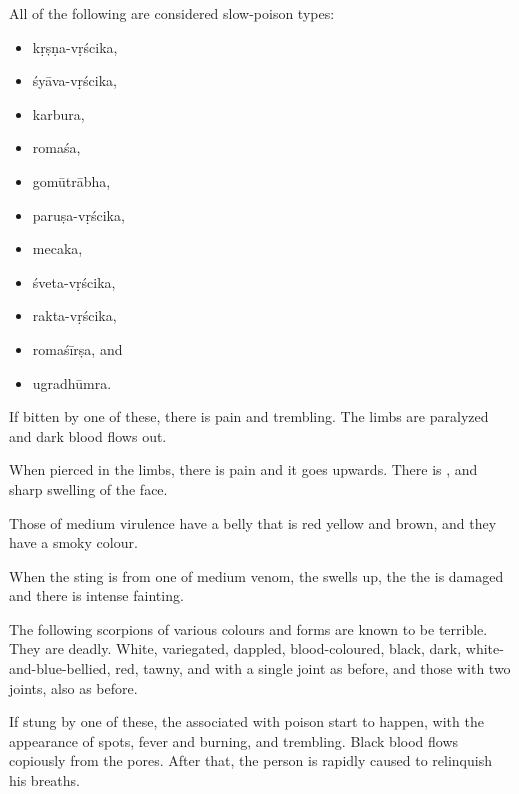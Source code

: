 \begin{translation}
All of the following are considered slow-poison types:
\begin{itemize}
    \item \Gls{kṛṣṇa-vṛścika},
    \item \Gls{śyāva-vṛścika},
    \item \Gls{karbura},
    \item \Gls{romaśa},
    \item \Gls{gomūtrābha},
    \item \Gls{paruṣa-vṛścika},
    \item \Gls{mecaka},
    \item \Gls{śveta-vṛścika},
    \item \Gls{rakta-vṛścika},
    \item \Gls{romaśīrṣa}, and
    \item \Gls{ugradhūmra}.    
\end{itemize}
If bitten by one of these, there is pain and trembling.  The limbs are paralyzed 
and dark blood flows out. 

\item[61ab]

When pierced in the limbs, there is pain and it goes upwards.  There is 
, and sharp swelling of the face.  

\item [61cd]

Those of medium virulence have a belly that is red
yellow and brown, and they have a smoky colour. 

\item[63ab]

When the sting is from one of medium venom, the  swells 
up, the the  is damaged and there is intense 
fainting.


\item[63cd, 64cd, 65ab]

The following scorpions of various colours and forms are known to be terrible.
They are deadly.
White, variegated, dappled, blood-coloured, black, dark, white-and-blue-bellied, 
red, tawny, and with a single joint as before, and those with two joints, also as 
before.

\item[66]

If stung by one of these, the  associated with poison start to 
happen, with the appearance of spots, fever and burning, and trembling.  Black 
blood flows copiously from the pores.  After that, the person is rapidly caused to 
relinquish his breaths. 


\end{translation}
